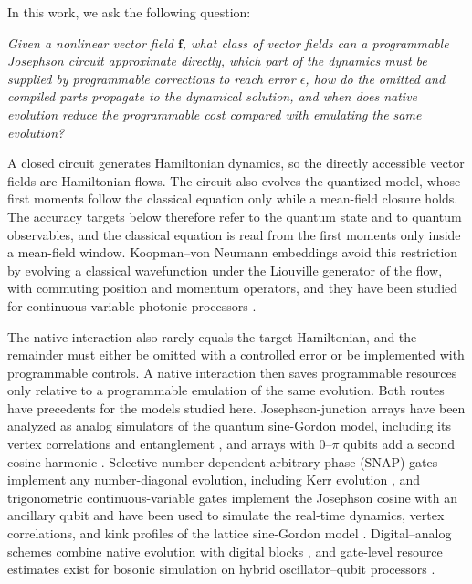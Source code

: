 \documentclass[pra,twocolumn,superscriptaddress,nofootinbib,floatfix]{revtex4-2}
\theoremstyle{remark}
\newcommand{\revcolor}{\color{blue}}
\DeclareRobustCommand{\rev}[1]{{\revcolor #1}}
\begin{document}
In this work, we ask the following question:

\rev{\emph{Given a nonlinear vector field \(\mathbf f\), what class of vector fields can a programmable Josephson circuit approximate directly, which part of the dynamics must be supplied by programmable corrections to reach error \(\epsilon\), how do the omitted and compiled parts propagate to the dynamical solution, and when does native evolution reduce the programmable cost compared with emulating the same evolution?}}

\rev{A closed circuit generates Hamiltonian dynamics, so the directly accessible vector fields are Hamiltonian flows.} \rev{The circuit also evolves the quantized model, whose first moments follow the classical equation only while a mean-field closure holds.} \rev{The accuracy targets below therefore refer to the quantum state and to quantum observables, and the classical equation is read from the first moments only inside a mean-field window.} \rev{Koopman--von Neumann embeddings avoid this restriction by evolving a classical wavefunction under the Liouville generator of the flow, with commuting position and momentum operators, and they have been studied for continuous-variable photonic processors \cite{gao2025implementingkoopmanvonneumannapproach}.}

\rev{The native interaction also rarely equals the target Hamiltonian, and the remainder must either be omitted with a controlled error or be implemented with programmable controls.} \rev{A native interaction then saves programmable resources only relative to a programmable emulation of the same evolution.} \rev{Both routes have precedents for the models studied here.} \rev{Josephson-junction arrays have been analyzed as analog simulators of the quantum sine-Gordon model, including its vertex correlations and entanglement \cite{Roy2021}, and arrays with \(0\)--\(\pi\) qubits add a second cosine harmonic \cite{RoyLukyanov2023Confinement,Roy2023Multicritical}.} \rev{Selective number-dependent arbitrary phase (SNAP) gates implement any number-diagonal evolution, including Kerr evolution \cite{Krastanov_2015,Heeres_2015}, and trigonometric continuous-variable gates implement the Josephson cosine with an ancillary qubit and have been used to simulate the real-time dynamics, vertex correlations, and kink profiles of the lattice sine-Gordon model \cite{Rainaldi2026TrigonometricCV}.} \rev{Digital--analog schemes combine native evolution with digital blocks \cite{ParraRodriguez2020DAQC,DigitalAnalogFermionBoson2025}, and gate-level resource estimates exist for bosonic simulation on hybrid oscillator--qubit processors \cite{Crane2024Hybrid}.}
\end{document}
